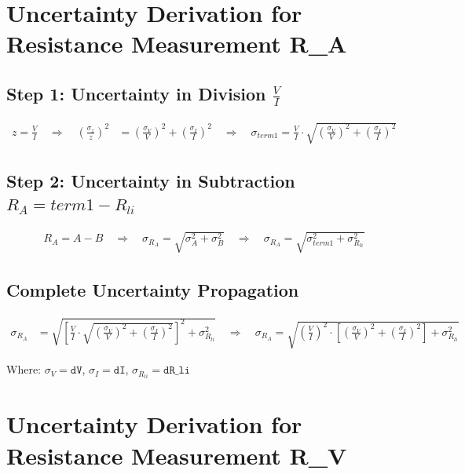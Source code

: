 \documentclass{article} %
\begin{document}
\appendix

\section{Uncertainty Derivation for Resistance Measurement R\_A}
\label{app:a_RA_uncertainty}

\subsection*{Step 1: Uncertainty in Division $\frac{V}{I}$}
\begin{align*}
z = \frac{V}{I} \quad \Rightarrow \quad \left(\frac{\sigma_z}{z}\right)^2 &= \left(\frac{\sigma_V}{V}\right)^2 + \left(\frac{\sigma_I}{I}\right)^2 \quad \Rightarrow \quad \sigma_{term1} = \frac{V}{I} \cdot \sqrt{\left(\frac{\sigma_V}{V}\right)^2 + \left(\frac{\sigma_I}{I}\right)^2}
\end{align*}

\subsection*{Step 2: Uncertainty in Subtraction $R_A = term1 - R_{li}$}
\begin{align*}
R_A = A - B \quad \Rightarrow \quad \sigma_{R_A} = \sqrt{\sigma_A^2 + \sigma_B^2} \quad \Rightarrow \quad \sigma_{R_A} = \sqrt{\sigma_{term1}^2 + \sigma_{R_{li}}^2}
\end{align*}

\subsection*{Complete Uncertainty Propagation}
\begin{align*}
\sigma_{R_A} &= \sqrt{\left[\frac{V}{I} \cdot \sqrt{\left(\frac{\sigma_V}{V}\right)^2 + \left(\frac{\sigma_I}{I}\right)^2}\right]^2 + \sigma_{R_{li}}^2} \quad \Rightarrow \quad \sigma_{R_A} = \sqrt{\left(\frac{V}{I}\right)^2 \cdot \left[\left(\frac{\sigma_V}{V}\right)^2 + \left(\frac{\sigma_I}{I}\right)^2\right] + \sigma_{R_{li}}^2}
\end{align*}

Where: $\sigma_V = \texttt{dV}$, $\sigma_I = \texttt{dI}$, $\sigma_{R_{li}} = \texttt{dR\_li}$


\newpage

\section{Uncertainty Derivation for Resistance Measurement R\_V}
\label{app:b_RV_uncertainty}
\end{document}
